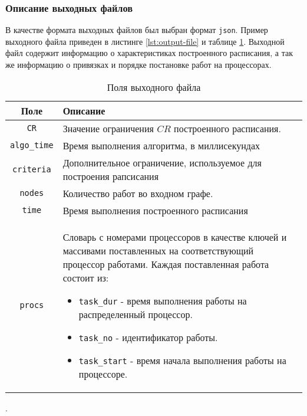 \subsubsection{Описание выходных файлов}
В качестве формата выходных файлов был выбран формат \texttt{json}. Пример выходного файла приведен в листинге \ref{lst:output-file} и таблице \ref{tbl:output-file-fields}. Выходной файл содержит информацию о характеристиках построенного расписания, а так же информацию о привязках и порядке постановке работ на процессорах.
\begin{table}[!htbp]
    \centering
    \begin{tabularx}{\textwidth}{|c|X|}
        \hline
        Поле                & Описание                                                                                                                                                \\
        \hline
        \texttt{CR}         & Значение ограничения $CR$ построенного расписания.                                                                                                      \\
        \hline
        \texttt{algo\_time} & Время выполнения алгоритма, в миллисекундах                                                                                                             \\
        \hline
        \texttt{criteria}   & Дополнительное ограничение, используемое для построения рапсисания                                                                                      \\
        \hline
        \texttt{nodes}      & Количество работ во входном графе.                                                                                                                      \\
        \hline
        \texttt{time}       & Время выполнения построенного расписания                                                                                                                \\
        \hline
        \texttt{procs}      & Словарь с номерами процессоров в качестве ключей и массивами поставленных на соответствующий процессор работами. Каждая поставленная работа состоит из:
        \begin{itemize}
            \item \texttt{task\_dur} - время выполнения работы на распределенный процессор.
            \item \texttt{task\_no} - идентификатор работы.
            \item \texttt{task\_start} - время начала выполнения работы на процессоре.
        \end{itemize}                                                                                                  \\
        \hline
    \end{tabularx}
    \caption{Поля выходного файла}.
    \label{tbl:output-file-fields}
\end{table}

